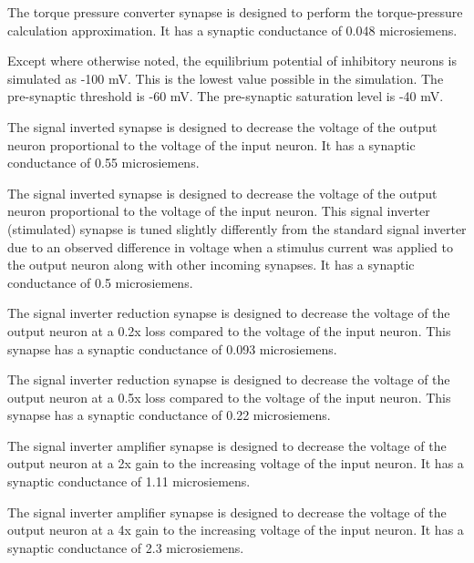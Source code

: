 
The torque pressure converter synapse is designed to perform the torque-pressure
calculation approximation. It has a synaptic 
conductance of 0.048 microsiemens.


Except where otherwise noted, the equilibrium potential of inhibitory neurons
is simulated as -100 mV. This is the lowest value possible in the simulation.
The pre-synaptic threshold is -60 mV. The pre-synaptic saturation level is -40
mV.


The signal inverted synapse is designed to decrease the voltage of the output 
neuron proportional to the voltage of the input neuron. It has a synaptic 
conductance of 0.55 microsiemens.


The signal inverted synapse is designed to decrease the voltage of the output 
neuron proportional to the voltage of the input neuron. This signal inverter (stimulated) synapse is tuned
slightly differently from the standard signal inverter due to an
observed difference in voltage when a stimulus current was applied to the output
neuron along with other incoming synapses. It has a synaptic 
conductance of 0.5 microsiemens.


The signal inverter reduction synapse is designed to decrease the voltage of
the output 
neuron at a 0.2x loss compared to the voltage of the input neuron. This synapse has a 
synaptic conductance of 0.093 microsiemens.


The signal inverter reduction synapse is designed to decrease the voltage of
the output 
neuron at a 0.5x loss compared to the voltage of the input neuron. This synapse has a 
synaptic conductance of 0.22 microsiemens.


The signal inverter amplifier synapse is designed to decrease the voltage of
the output 
neuron at a 2x gain to the increasing voltage of the input neuron. It has a synaptic 
conductance of 1.11 microsiemens.


The signal inverter amplifier synapse is designed to decrease the voltage of
the output 
neuron at a 4x gain to the increasing voltage of the input neuron. It has a synaptic 
conductance of 2.3 microsiemens.

